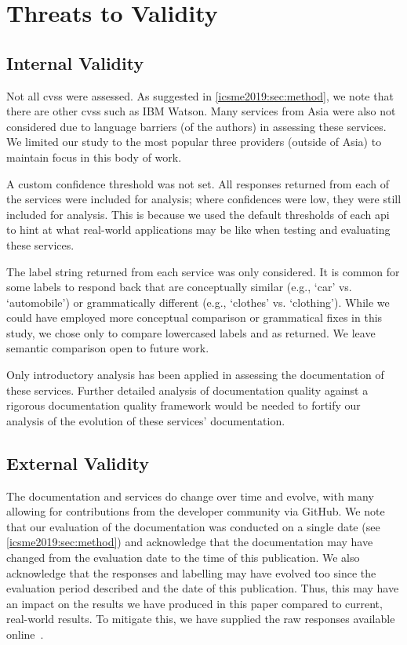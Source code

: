 \section{Threats to Validity}
\label{icsme2019:sec:limitations}

\subsection{Internal Validity}
Not all \glspl{cvs} were assessed. As suggested in \cref{icsme2019:sec:method}, we note that there are other \glspl{cvs} such as IBM Watson. Many services from Asia were also not considered due to language barriers (of the authors) in assessing these services. We limited our study to the most popular three providers (outside of Asia) to maintain focus in this body of work.
 
A custom confidence threshold was not set. All responses returned from each of the services were included for analysis; where confidences were low, they were still included for analysis. This is because we used the default thresholds of each \gls{api} to hint at what real-world applications may be like when testing and evaluating these services.

The label string returned from each service was only considered. It is common for some labels to respond back that are conceptually similar (e.g., `car' vs. `automobile') or grammatically different (e.g., `clothes' vs. `clothing'). While we could have employed more conceptual comparison or grammatical fixes in this study, we chose only to compare lowercased labels and as returned. We leave semantic comparison open to future work.

Only introductory analysis has been applied in assessing the documentation of these services. Further detailed analysis of documentation quality against a rigorous documentation quality framework would be needed to fortify our analysis of the evolution of these services' documentation.

\subsection{External Validity}

The documentation and services do change over time and evolve, with many allowing for contributions from the developer community via GitHub. We note that our evaluation of the documentation was conducted on a single date (see \cref{icsme2019:sec:method}) and acknowledge that the documentation may have changed from the evaluation date to the time of this publication. We also acknowledge that the responses and labelling may have evolved too since the evaluation period described and the date of this publication. Thus, this may have an impact on the results we have produced in this paper compared to current, real-world results. To mitigate this, we have supplied the raw responses available online~.

